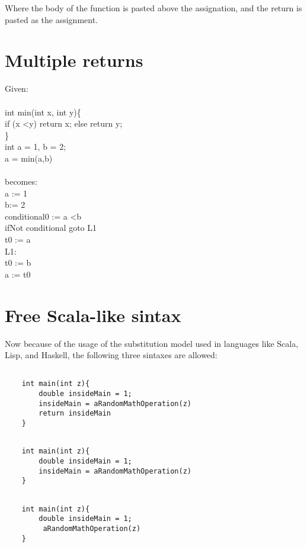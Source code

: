 \documentclass[twocolumn,10ptr]{article}
\begin{document}
	Where the body of the function is pasted above the assignation, and the return is pasted as the assignment.
	
	
	\section{Multiple returns}
	Given: \\
	\\
	int min(int x, int y)\{ \\
	
	if (x \textless  y) return x;
	else return y; \\
	\}\\
	int a = 1, b = 2; \\
	a = min(a,b)\\
	\\
	becomes: \\
	a := 1 \\
	b:= 2 \\
	conditional0 := a \textless b\\
	ifNot conditional goto L1\\
		t0 := a\\
	L1: \\
		t0 := b\\
		a := t0\\
		
		 
	\section{Free Scala-like sintax}
	
	Now because of the usage of the substitution model used in languages like Scala, Lisp, and Haskell, the following three sintaxes are allowed: 
	
	
	\begin{lstlisting}

	int main(int z){
		double insideMain = 1;
		insideMain = aRandomMathOperation(z)
		return insideMain
	}
	\end{lstlisting}
	
	
	
	\begin{lstlisting}

	int main(int z){
		double insideMain = 1;
		insideMain = aRandomMathOperation(z)
	}
	\end{lstlisting}
	
	
	\begin{lstlisting}

	int main(int z){
		double insideMain = 1;
		 aRandomMathOperation(z)
	}
	\end{lstlisting}
	
\end{document}
